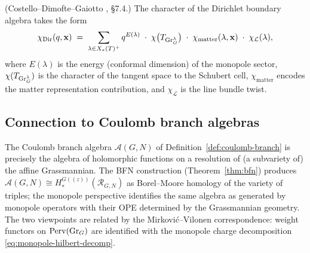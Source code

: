 \begin{proposition}
\label{prop:dirichlet-character}
\textup{(Costello--Dimofte--Gaiotto \cite{CDG2023}, \S7.4.)}
The character of the Dirichlet boundary algebra takes the form
\begin{equation}\label{eq:dirichlet-character}
 \chi_{\mathrm{Dir}}(q,\mathbf{x})
 \;=\;
 \sum_{\lambda \in X_*(T)^+}
 q^{E(\lambda)}
 \;\cdot\;
 \chi\bigl(T_{\operatorname{Gr}_G^\lambda}\bigr)
 \;\cdot\;
 \chi_{\mathrm{matter}}(\lambda,\mathbf{x})
 \;\cdot\;
 \chi_{\mathcal{L}}(\lambda),
\end{equation}
where $E(\lambda)$ is the energy (conformal dimension) of the monopole
sector, $\chi(T_{\operatorname{Gr}_G^\lambda})$ is the character of the tangent space
to the Schubert cell, $\chi_{\mathrm{matter}}$ encodes the matter
representation contribution, and $\chi_{\mathcal{L}}$ is the line
bundle twist.
\end{proposition}

\subsection{Connection to Coulomb branch algebras}
\label{sec:monopole-coulomb-connection}

\begin{remark}
\label{rem:coulomb-grassmannian}
The Coulomb branch algebra $\mathcal{A}(G,N)$ of
Definition~\ref{def:coulomb-branch} is precisely the algebra of
holomorphic functions on a resolution of (a subvariety of) the affine
Grassmannian. The BFN construction
(Theorem~\ref{thm:bfn}) produces
$\mathcal{A}(G,N) \cong H^{G(\!(z)\!)}_*(\mathcal{R}_{G,N})$
as Borel--Moore homology of the variety of triples; the monopole
perspective identifies the same algebra as generated by monopole
operators with their OPE determined by the Grassmannian geometry.
The two viewpoints are related by the Mirkovi\'c--Vilonen
correspondence: weight functors on $\operatorname{Perv}(\operatorname{Gr}_G)$ are
identified with the monopole charge decomposition
\eqref{eq:monopole-hilbert-decomp}.
\end{remark}

